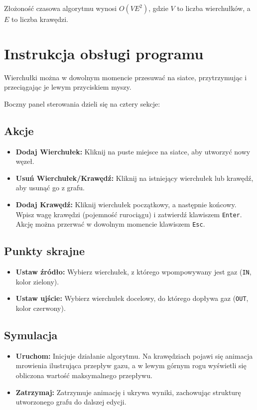 \documentclass{article}
\begin{document}
	Złożoność czasowa algorytmu wynosi $O(V E^2)$, gdzie $V$ to liczba wierchułków, a $E$ to liczba krawędzi.
	
	\section{Instrukcja obsługi programu}
	
	Wierchułki można w dowolnym momencie przesuwać na siatce, przytrzymując i przeciągając je lewym przyciskiem myszy.
	
	Boczny panel sterowania dzieli się na cztery sekcje:
	
	\subsection*{Akcje}
	\begin{itemize}
		\item \textbf{Dodaj Wierchułek:} Kliknij na puste miejsce na siatce, aby utworzyć nowy węzeł.
		\item \textbf{Usuń Wierchułek/Krawędź:} Kliknij na istniejący wierchułek lub krawędź, aby usunąć go z grafu.
		\item \textbf{Dodaj Krawędź:} Kliknij wierchułek początkowy, a następnie końcowy. Wpisz wagę krawędzi (pojemność rurociągu) i zatwierdź klawiszem \texttt{Enter}. Akcję można przerwać w dowolnym momencie klawiszem \texttt{Esc}.
	\end{itemize}
	
	\subsection*{Punkty skrajne}
	\begin{itemize}
		\item \textbf{Ustaw źródło:} Wybierz wierchułek, z którego wpompowywany jest gaz (\texttt{IN}, kolor zielony).
		\item \textbf{Ustaw ujście:} Wybierz wierchułek docelowy, do którego dopływa gaz (\texttt{OUT}, kolor czerwony).
	\end{itemize}
	
	\subsection*{Symulacja}
	\begin{itemize}
		\item \textbf{Uruchom:} Inicjuje działanie algorytmu. Na krawędziach pojawi się animacja mrowienia ilustrująca przepływ gazu, a w lewym górnym rogu wyświetli się obliczona wartość maksymalnego przepływu.
		\item \textbf{Zatrzymaj:} Zatrzymuje animację i ukrywa wyniki, zachowując strukturę utworzonego grafu do dalszej edycji.
	\end{itemize}
	
\end{document}
